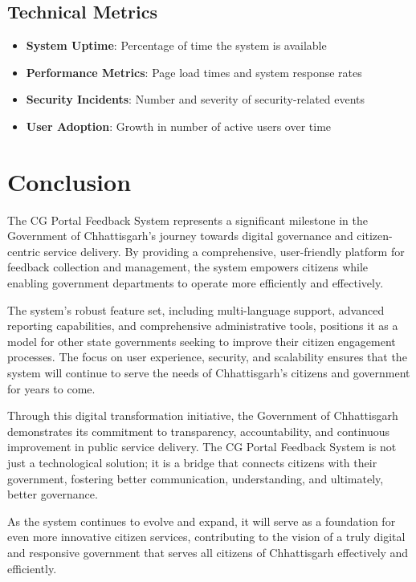 \documentclass[12pt,a4paper]{article}
\begin{document}
\subsection{Technical Metrics}

\begin{itemize}[leftmargin=2em]
    \item \textbf{System Uptime}: Percentage of time the system is available
    \item \textbf{Performance Metrics}: Page load times and system response rates
    \item \textbf{Security Incidents}: Number and severity of security-related events
    \item \textbf{User Adoption}: Growth in number of active users over time
\end{itemize}

\section{Conclusion}

The CG Portal Feedback System represents a significant milestone in the Government of Chhattisgarh's journey towards digital governance and citizen-centric service delivery. By providing a comprehensive, user-friendly platform for feedback collection and management, the system empowers citizens while enabling government departments to operate more efficiently and effectively.

The system's robust feature set, including multi-language support, advanced reporting capabilities, and comprehensive administrative tools, positions it as a model for other state governments seeking to improve their citizen engagement processes. The focus on user experience, security, and scalability ensures that the system will continue to serve the needs of Chhattisgarh's citizens and government for years to come.

Through this digital transformation initiative, the Government of Chhattisgarh demonstrates its commitment to transparency, accountability, and continuous improvement in public service delivery. The CG Portal Feedback System is not just a technological solution; it is a bridge that connects citizens with their government, fostering better communication, understanding, and ultimately, better governance.

As the system continues to evolve and expand, it will serve as a foundation for even more innovative citizen services, contributing to the vision of a truly digital and responsive government that serves all citizens of Chhattisgarh effectively and efficiently.
\end{document}
